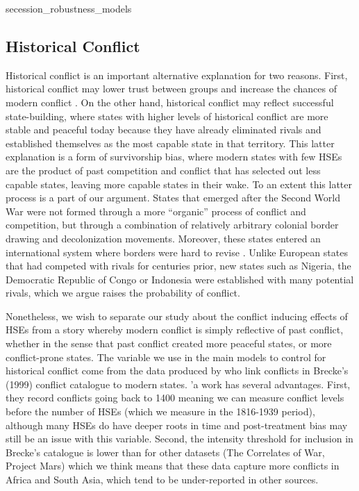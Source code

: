         {secession_robustness_models}

 \clearpage   
 
\subsection{Historical Conflict}

Historical conflict is an important alternative explanation for two reasons. First, historical conflict may lower trust between groups and increase the chances of modern conflict \citep{Besley2014}. On the other hand, historical conflict may reflect successful state-building, where states with higher levels of historical conflict are more stable and peaceful today because they have already eliminated rivals and established themselves as the most capable state in that territory. This latter explanation is a form of survivorship bias, where modern states with few HSEs are the product of past competition and conflict that has selected out less capable states, leaving more capable states in their wake. To an extent this latter process is a part of our argument. States that emerged after the Second World War were not formed through a more ``organic'' process of conflict and competition, but through a combination of relatively arbitrary colonial border drawing and decolonization movements. Moreover, these states entered an international system where borders were hard to revise \citep{Herbst2014}. Unlike European states that had competed with rivals for centuries prior, new states such as Nigeria, the Democratic Republic of Congo or Indonesia were established with many potential rivals, which we argue raises the probability of conflict. 

Nonetheless, we wish to separate our study about the conflict inducing effects of HSEs from a story whereby modern conflict is simply reflective of past conflict, whether in the sense that past conflict created more peaceful states, or more conflict-prone states. The variable we use in the main models to control for historical conflict come from the data produced by \citet{Dincecco2019} who link conflicts in Brecke's (1999) conflict catalogue to modern states. \citet{Dincecco2019}'a work has several advantages. First, they record conflicts going back to 1400 meaning we can measure conflict levels before the number of HSEs (which we measure in the 1816-1939 period), although many HSEs do have deeper roots in time and post-treatment bias may still be an issue with this variable. Second, the intensity threshold for inclusion in Brecke's catalogue is lower than for other datasets (The Correlates of War, Project Mars) which we think means that these data capture more conflicts in Africa and South Asia, which tend to be under-reported in other sources. 

